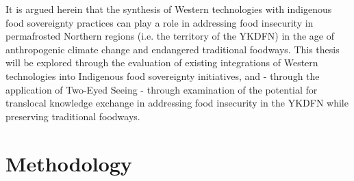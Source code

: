 \documentclass{report}
\begin{document}
\hspace{24pt} It is argued herein that the synthesis of Western technologies with indigenous food sovereignty practices can play a role in addressing food insecurity in permafrosted Northern regions (i.e. the territory of the YKDFN) in the age of anthropogenic climate change and endangered traditional foodways. 
This thesis will be explored through the evaluation of existing integrations of Western technologies into Indigenous food sovereignty initiatives, and - through the application of Two-Eyed Seeing - through examination of the potential for translocal knowledge exchange in addressing food insecurity in the YKDFN while preserving traditional foodways.








\clearpage

\section{Methodology}
\end{document}
